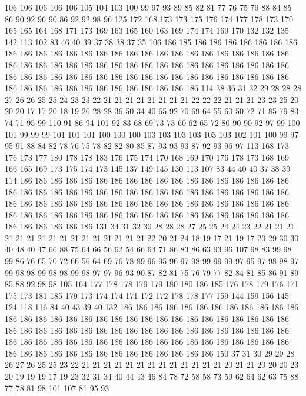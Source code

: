 106 106 106 106 106 105 104 103 100 99 97 93 89 85 82 81 77 76 75 79
88 84 85 86 90 92 96 90 86 92 92 98 96 125 172 168 173 173 175 176
174 177 178 173 170 165 165 164 168 171 173 169 163 165 160 163 169 174 174 169
170 132 132 135 142 113 102 83 46 40 39 37 38 38 37 35 106 186 185 186
186 186 186 186 186 186 186 186 186 186 186 186 186 186 186 186 186 186 186 186
186 186 186 186 186 186 186 186 186 186 186 186 186 186 186 186 186 186 186 186
186 186 186 186 186 186 186 186 186 186 186 186 186 186 186 186 186 186 186 186
186 186 186 186 186 186 186 186 186 186 186 186 186 186 186 186 114 38 36 31
32 29 28 28 28 27 26 26 25 25 24 23 23 22 21 21 21 21 21 21
21 21 22 22 22 21 21 21 23 23 25 20 20 20 17 17 20 18 19 26
28 28 36 50 34 40 65 92 70 69 64 55 60 50 72 71 85 79 83 74
71 95 99 110 91 86 94 101 92 83 68 69 73 73 60 62 65 72 80 90
90 92 97 99 100 101 99 99 99 101 101 101 100 100 100 103 103 103 103 103
103 102 101 100 99 97 95 91 88 84 82 78 76 75 78 82 82 80 85 87
93 93 93 87 92 93 96 97 113 168 173 176 173 177 180 178 178 183 176 175
174 170 168 169 170 176 178 173 168 169 166 165 169 173 175 174 173 145 137 149
145 130 113 107 83 44 40 40 37 38 39 114 186 186 186 186 186 186 186 186
186 186 186 186 186 186 186 186 186 186 186 186 186 186 186 186 186 186 186 186
186 186 186 186 186 186 186 186 186 186 186 186 186 186 186 186 186 186 186 186
186 186 186 186 186 186 186 186 186 186 186 186 186 186 186 186 186 186 186 186
186 186 186 186 186 186 186 186 186 186 186 186 186 131 34 31 32 30 28 28
28 27 25 25 24 24 23 22 21 21 21 21 21 21 21 21 21 21 21 21
21 21 21 21 22 20 21 24 18 19 17 21 19 17 20 29 30 30 40 48
40 47 66 88 75 64 66 56 62 54 66 64 71 86 83 86 63 93 96 107
98 83 99 98 99 86 76 65 70 72 66 56 64 69 76 78 89 96 95 96
97 98 99 99 99 97 95 97 98 98 97 99 98 98 99 98 98 99 98 97
97 96 93 90 87 82 81 75 76 79 77 82 84 81 85 86 91 89 85 88
92 98 98 105 164 177 178 178 179 179 180 180 186 185 176 178 179 176 171 175
173 181 185 179 173 174 174 171 172 172 178 178 177 159 144 159 156 145 124 118
116 84 40 43 39 40 132 186 186 186 186 186 186 186 186 186 186 186 186 186
186 186 186 186 186 186 186 186 186 186 186 186 186 186 186 186 186 186 186 186
186 186 186 186 186 186 186 186 186 186 186 186 186 186 186 186 186 186 186 186
186 186 186 186 186 186 186 186 186 186 186 186 186 186 186 186 186 186 186 186
186 186 186 186 186 186 186 186 186 186 150 37 31 30 29 29 28 26 27 26
25 25 23 22 21 21 21 21 21 21 21 21 21 21 21 21 21 20 21 21
20 20 20 23 20 19 19 19 17 19 23 32 31 34 40 44 43 46 84 78
72 58 58 73 59 62 64 62 63 75 88 77 78 81 98 101 107 81 95 93
